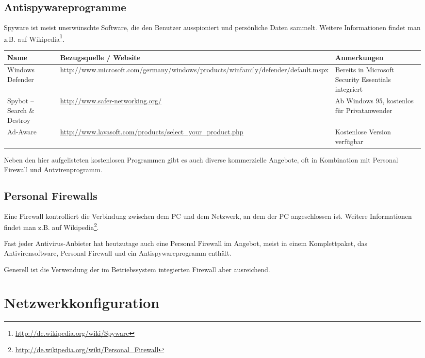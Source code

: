 \documentclass[a4paper,12pt]{scrartcl}
\begin{document}
\subsection*{Antispywareprogramme}

Spyware ist meist unerwünschte Software, die den Benutzer ausspioniert und persönliche Daten sammelt. Weitere Informationen findet man z.B. auf Wikipedia\footnote{\url{http://de.wikipedia.org/wiki/Spyware}}.

\begin{center}
  \begin{tabularx}{\linewidth}{|p{.18\linewidth}Xp{.3\linewidth}|}
    \hline
    Name & Bezugsquelle / Website & Anmerkungen\\
    \hline \hline
    Windows Defender & \url{http://www.microsoft.com/germany/windows/products/winfamily/defender/default.mspx} & Bereits in Microsoft Security Essentials integriert\\
    \hline
    Spybot – Search \& Destroy & \url{http://www.safer-networking.org/} & Ab Windows 95, kostenlos für Privatanwender\\
    \hline
    Ad-Aware & \url{http://www.lavasoft.com/products/select\_your\_product.php} & Kostenlose Version verfügbar\\
    \hline
  \end{tabularx}
\end{center}

Neben den hier aufgelisteten kostenlosen Programmen gibt es auch diverse kommerzielle Angebote, oft in Kombination mit Personal Firewall und Antvirenprogramm.

\subsection*{Personal Firewalls}

Eine Firewall kontrolliert die Verbindung zwischen dem PC und dem Netzwerk, an dem der PC angeschlossen ist. Weitere Informationen findet man z.B. auf Wikipedia\footnote{\url{http://de.wikipedia.org/wiki/Personal\_Firewall}}.

Fast jeder Antivirus-Anbieter hat heutzutage auch eine Personal Firewall im Angebot, meist in einem Komplettpaket, das Antivirensoftware, Personal Firewall und ein Antispywareprogramm enthält.

Generell ist die Verwendung der im Betriebssystem integierten Firewall aber ausreichend.

\newpage

\section*{Netzwerkkonfiguration}
\end{document}
